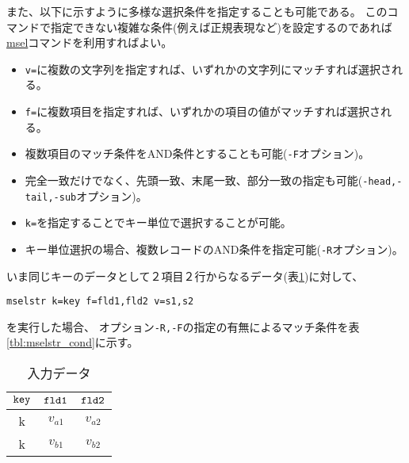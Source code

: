 また、以下に示すように多様な選択条件を指定することも可能である。
このコマンドで指定できない複雑な条件(例えば正規表現など)を設定するのであれば
\hyperref[sect:msel]{msel}コマンドを利用すればよい。

\begin{itemize}
\item \verb|v=|に複数の文字列を指定すれば、いずれかの文字列にマッチすれば選択される。
\item \verb|f=|に複数項目を指定すれば、いずれかの項目の値がマッチすれば選択される。
\item 複数項目のマッチ条件をAND条件とすることも可能(\verb|-F|オプション)。
\item 完全一致だけでなく、先頭一致、末尾一致、部分一致の指定も可能(\verb|-head,-tail,-sub|オプション)。
\item \verb|k=|を指定することでキー単位で選択することが可能。
\item キー単位選択の場合、複数レコードのAND条件を指定可能(\verb|-R|オプション)。
\end{itemize}

いま同じキーのデータとして２項目２行からなるデータ(表\ref{tbl:mselstr_input2})に対して、
\begin{Verbatim}[baselinestretch=0.7,frame=single,fontsize=\small]
mselstr k=key f=fld1,fld2 v=s1,s2
\end{Verbatim}
を実行した場合、
オプション\verb|-R,-F|の指定の有無によるマッチ条件を表\ref{tbl:mselstr_cond}に示す。

\begin{table}[htbp]
\begin{center}

\caption{入力データ\label{tbl:mselstr_input2}}
{\small
\begin{tabular}{ccc}
\hline
$\verb|key|$ & $\verb|fld1|$ & $\verb|fld2|$ \\
\hline
k & $v_{a1}$ & $v_{a2}$ \\
k & $v_{b1}$ & $v_{b2}$ \\
\hline

\end{tabular}
}
\end{center}
\end{table}

